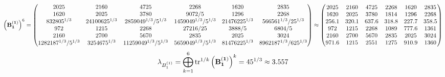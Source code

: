 \documentclass[10pt,a4paper]{article}
\begin{document}
	\[
		\left(\bold{B_1^{(1)}}\right)^{6} = 
		\begin{pmatrix}
			{{2025}}{} & {{2160}}{} & {{4725}}{} & {{2268}}{} & {{1620}}{} & {{2835}}{} \\
			{{1620}}{} & {{2025}}{} & {{3780}}{} & {{9072}} / {{5}} & {{1296}}{} & {{2268}}{} \\
			{{8}{32805^ {1 / 3}}}{} & {{2}{4100625^ {1 / 3}}}{} & {{28}{59049^ {1 / 3}}} / {{5^ {1 / 3}}} & {{14}{59049^ {1 / 3}}} / {{5^ {1 / 3}}} & {{2}{1476225^ {1 / 3}}}{} & {{56}{6561^ {1 / 3}}} / {{25^ {1 / 3}}} \\
			{{972}}{} & {{1215}}{} & {{2268}}{} & {{27216}} / {{25}} & {{3888}} / {{5}} & {{6804}} / {{5}} \\
			{{2160}}{} & {{2700}}{} & {{5670}}{} & {{2835}}{} & {{2025}}{} & {{3024}}{} \\
			{{128}{2187^ {1 / 3}}} / {{5^ {1 / 3}}} & {{32}{54675^ {1 / 3}}}{} & {{112}{59049^ {1 / 3}}} / {{5^ {1 / 3}}} & {{56}{59049^ {1 / 3}}} / {{5^ {1 / 3}}} & {{8}{1476225^ {1 / 3}}}{} & {{896}{2187^ {1 / 3}}} / {{625^ {1 / 3}}} \\
		\end{pmatrix}
		\approx
		\begin{pmatrix}
			2025     & 2160     & 4725     & 2268     & 1620     & 2835     \\
			1620     & 2025     & 3780     & 1814     & 1296     & 2268     \\
			256.1    & 320.1    & 637.6    & 318.8    & 227.7    & 358.5    \\
			972      & 1215     & 2268     & 1089     & 777.6    & 1361     \\
			2160     & 2700     & 5670     & 2835     & 2025     & 3024     \\
			971.6    & 1215     & 2551     & 1275     & 910.9    & 1360     \\
		\end{pmatrix}
	\]
	\[
		\lambda_{B_1^{(1)}} =  \bigoplus ^{6} _{k = 1} \operatorname{tr} ^{1 / k} \left( \bold{B_1^{(1)}} \right)^k = {{45^ {1 / 3}}}{}\approx 3.557
	\]
\end{document}

